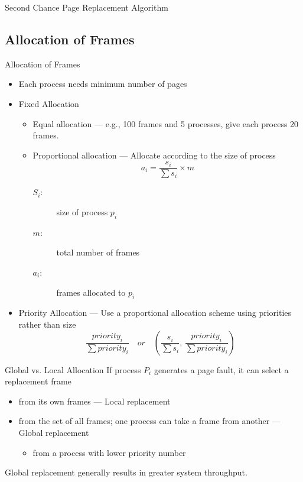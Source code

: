 \begin{frame}{Second Chance Page Replacement Algorithm}
  \begin{center}
  \end{center}
\end{frame}

\subsection{Allocation of Frames}

\begin{frame}{Allocation of Frames}
  \begin{itemize}
  \item Each process needs minimum number of pages
  \item Fixed Allocation
    \begin{itemize}
    \item Equal allocation --- e.g., 100 frames and 5 processes, give
      each process 20 frames.
    \item Proportional allocation --- Allocate according to the size of process
      $$a_i=\frac{s_i}{\sum{}s_i}\times{}m$$
      \begin{description}
      \item[$S_i$:] size of process $p_i$
      \item[$m$:] total number of frames
      \item[$a_i$:] frames allocated to $p_i$
      \end{description}
    \end{itemize}
  \item Priority Allocation --- Use a proportional allocation scheme
    using priorities rather than size
    $$\frac{priority_i}{\sum{}priority_i}\quad or\quad (\frac{s_i}{\sum{}s_i},\,\frac{priority_i}{\sum{}priority_i})$$
  \end{itemize}
\end{frame}

\begin{frame}{Global vs. Local Allocation}
  If process $P_i$ generates a page fault, it can select a replacement frame
  \begin{itemize}
  \item from its own frames --- \alert{Local replacement}
  \item from the set of all frames; one process can take a frame from another ---
    \alert{Global replacement}
    \begin{itemize}
    \item from a process with lower priority number
    \end{itemize}
  \end{itemize}
  \alert{Global replacement generally results in greater system throughput.}
\end{frame}

